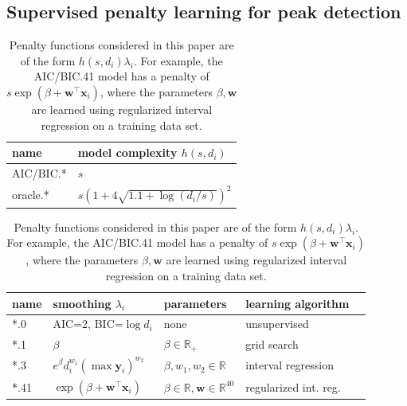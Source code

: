 \documentclass{article}
\newcommand{\RR}{\mathbb R}
\begin{document}
\subsection{Supervised penalty learning for peak detection}
\label{sec:supervised}

\begin{table}[b!]

  \begin{minipage}{0.4\textwidth}
  \begin{tabular}{ll}
    \textbf{name} & \textbf{model complexity} $h(s, d_i)$ \\
    \hline
    AIC/BIC.* & $s$\\
    oracle.* & $s\left(1 + 4\sqrt{1.1 + \log(d_i/s)}\right)^2$
  \end{tabular}
  \end{minipage}
  \begin{minipage}{0.5\textwidth}
  \begin{tabular}{lllll}
    \textbf{name} & \textbf{smoothing} $\lambda_i$ & 
    \textbf{parameters} & \textbf{learning algorithm} \\
    \hline
    *.0 & AIC=2, BIC=$\log d_i$ & none & unsupervised \\
    *.1 & 
    $\beta$ & 
    $\beta\in\RR_+$ & grid search \\
    *.3 & 
    $e^\beta d_i^{w_1} (\max \mathbf y_i)^{w_{2}}$ & 
    $\beta, w_1, w_{2}\in\RR$ & interval regression \\
    *.41 & 
    $\exp(\beta + \mathbf w^\intercal \mathbf x_i)$ & 
    $\beta\in\RR, \mathbf w\in\RR^{40}$ & 
    regularized int. reg. \\
  \end{tabular}
  \end{minipage}

  \caption{Penalty functions considered in this paper are of the form
    $h(s, d_i) \lambda_i $.
    For example, the AIC/BIC.41 model has a penalty of
    $s \exp(\beta + \mathbf w^\intercal \mathbf x_i)$, 
    where the parameters $\beta,\mathbf w$ 
    are learned using regularized interval regression 
    on a training data set.
  }
  \label{tab:penalties}
\end{table}
\end{document}
